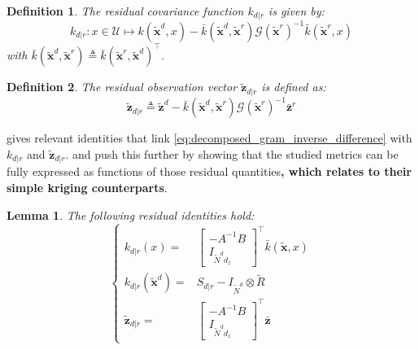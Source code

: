 \documentclass[preprint]{elsarticle}
\newtheorem{definition}{Definition}
\newtheorem{lemma}{Lemma}
\begin{document}
\begin{definition}
    The residual covariance function $k_{d|r}$ is given by:
    \begin{equation*}
        k_{d|r}:x\in\mathcal{U}\mapsto k(\tilde{\mathbf{x}}^d,x)-\bar{k}(\tilde{\mathbf{x}}^d,\tilde{\mathbf{x}}^r)\mathcal{G}(\tilde{\mathbf{x}}^r)^{-1}\bar{k}(\tilde{\mathbf{x}}^r,x)
    \end{equation*}
    with $\bar{k}(\tilde{\mathbf{x}}^d,\tilde{\mathbf{x}}^r)\triangleq\bar{k}(\tilde{\mathbf{x}}^r,\tilde{\mathbf{x}}^d)^\top$.\label{def:residual_covariance_function}
\end{definition}

\begin{definition}
    The residual observation vector $\tilde{\mathbf{z}}_{d|r}$ is defined as:
    \begin{equation*}
        \tilde{\mathbf{z}}_{d|r}\triangleq\tilde{\mathbf{z}}^d-\bar{k}(\tilde{\mathbf{x}}^d,\tilde{\mathbf{x}}^r)\mathcal{G}(\tilde{\mathbf{x}}^r)^{-1}\bar{\mathbf{z}}^r
    \end{equation*}\label{def:residual_observation_vector}
    \vspace{-\baselineskip}
\end{definition}

 gives relevant identities that link \eqref{eq:decomposed_gram_inverse_difference} with $k_{d|r}$ and $\tilde{\mathbf{z}}_{d|r}$.  and  push this further by showing that the studied metrics can be fully expressed as functions of those residual quantities\textbf{, which  relates to their simple kriging counterparts}.

\begin{lemma}
    The following residual identities hold:
    \begin{equation*}
        \left\{\begin{aligned}
        k_{d|r}(x)=&\begin{bmatrix}-A^{-1}B\\I_{\tilde{N}^dd_z}\end{bmatrix}^\top\bar{k}(\tilde{\mathbf{x}},x)\\
        k_{d|r}(\tilde{\mathbf{x}}^d)=&S_{d|r}-I_{\tilde{N}^d}\otimes\tilde{R}\\
        \tilde{\mathbf{z}}_{d|r}=&\begin{bmatrix}-A^{-1}B\\I_{\tilde{N}^dd_z}\end{bmatrix}^\top\bar{\mathbf{z}}
        \end{aligned}\right.
    \end{equation*}\label{th:residual_identities}
    \vspace{-\baselineskip}
\end{lemma}
\end{document}
